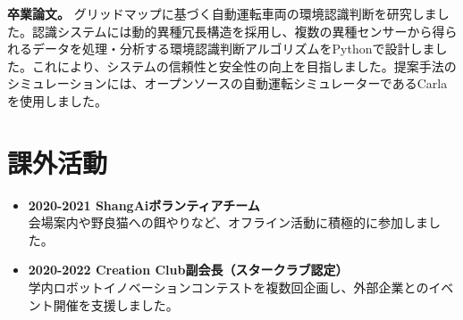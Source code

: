 \documentclass[letterpaper,11pt]{article}
\newcommand{\projectEntry}[2]{%
  \textbf{#1。} #2\par\vspace{0.85em}
}
\begin{document}
\projectEntry{卒業論文}{グリッドマップに基づく自動運転車両の環境認識判断を研究しました。認識システムには動的異種冗長構造を採用し、複数の異種センサーから得られるデータを処理・分析する環境認識判断アルゴリズムをPythonで設計しました。これにより、システムの信頼性と安全性の向上を目指しました。提案手法のシミュレーションには、オープンソースの自動運転シミュレーターであるCarlaを使用しました。}

\section{課外活動}

\begin{itemize}
  \item \textbf{2020-2021 ShangAiボランティアチーム}\\
  会場案内や野良猫への餌やりなど、オフライン活動に積極的に参加しました。

  \item \textbf{2020-2022 Creation Club副会長（スタークラブ認定）}\\
  学内ロボットイノベーションコンテストを複数回企画し、外部企業とのイベント開催を支援しました。
\end{itemize}
\end{document}
